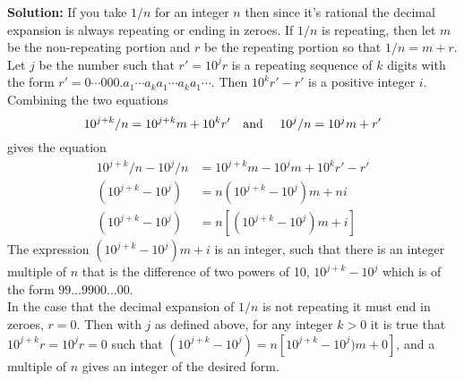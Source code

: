\documentclass{article}
\newcommand{\solution}[1]{\setlength{\hangindent}{\parindent} \indent\indent \textbf{Solution: }#1\hfill\break}
\begin{document}
\solution{If you take $1/n$ for an integer $n$ then since it's rational the decimal expansion is always repeating or ending in zeroes. If $1/n$ is repeating, then let $m$ be the non-repeating portion and $r$ be the repeating portion so that $1/n = m + r$. Let $j$ be the number such that $r'=10^jr$ is a repeating sequence of $k$ digits with the form $r'= 0\dotsb000.a_1\dotsb a_ka_1\dotsb a_ka_1\dotsb$. Then $10^kr' - r'$ is a positive integer $i$. Combining the two equations $$ 10^{j+k}/n = 10^{j+k}m +10^kr' \text{\quad and \quad} 10^j/n = 10^jm+r' $$ gives the equation \begin{align*}  10^{j+k}/n - 10^j/n &= 10^{j+k}m - 10^jm + 10^kr' - r' \\ (10^{j+k} - 10^j) &= n(10^{j+k} - 10^j)m  + n i \\ (10^{j+k} - 10^j) &= n [(10^{j+k} - 10^j)m + i]\end{align*}
\indent The expression $(10^{j+k} - 10^j)m + i$ is an integer, such that there is an integer multiple of $n$ that is the difference of two powers of 10, $10^{j+k} - 10^j$ which is of the form $99\dots 9900\dots00.$ \\ 
\indent In the case that the decimal expansion of $1/n$ is not repeating it must end in zeroes, $r=0$. Then with $j$ as defined above, for any integer $k>0$ it is true that $10^{j+k} r = 10^jr = 0$ such that $(10^{j+k} - 10^j) = n[10^{j+k}-10^j)m + 0]$, and a multiple of $n$ gives an integer of the desired form.} %

\newpage
\end{document}

